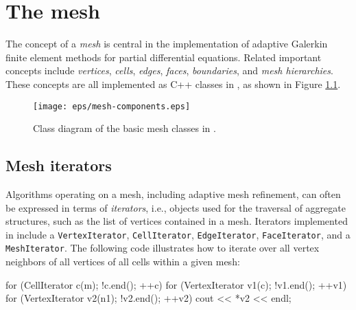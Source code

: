\chapter{The mesh}



The concept of a \emph{mesh} is central in the implementation of
adaptive Galerkin finite element methods for partial differential equations.
Related important concepts include \emph{vertices}, \emph{cells},
\emph{edges}, \emph{faces}, \emph{boundaries}, and \emph{mesh hierarchies}. These 
concepts are all implemented as C++ classes in \dolfin{}, as shown in Figure \ref{fig:meshclasses}.

\begin{figure}[htbp]
  \begin{center}
    \texttt{[image: eps/mesh-components.eps]}
    \caption{Class diagram of the basic mesh classes in \dolfin{}.}
    \label{fig:meshclasses}
  \end{center}
\end{figure}

\section{Mesh iterators}

Algorithms operating on a mesh, including adaptive mesh refinement,
can often be expressed in terms of
\emph{iterators}, i.e., objects used for the traversal of aggregate
structures, such as the list of vertices contained in a mesh. Iterators
implemented in \dolfin{} include a \texttt{VertexIterator},
\texttt{CellIterator}, \texttt{Edge}\-\texttt{Iterator}, \texttt{FaceIterator},
and a \texttt{MeshIterator}. The following code illustrates how to
iterate over all vertex neighbors of all vertices of all cells within a
given mesh:
\begin{code}
  for (CellIterator c(m); !c.end(); ++c)
    for (VertexIterator v1(c); !v1.end(); ++v1)
      for (VertexIterator v2(n1); !v2.end(); ++v2)
        cout << *v2 << endl;
\end{code}


